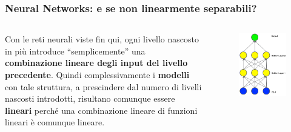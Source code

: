 \begin{frame}

	\frametitle{Neural Networks: e se non linearmente separabili?}

	\begin{columns}
		Con le reti neurali viste fin qui, ogni livello nascosto in più introduce ``semplicemente'' una \textbf{combinazione lineare degli input del livello precedente}.
		\newlinedouble
		Quindi complessivamente i \textbf{modelli} con tale struttura, a prescindere dal numero di livelli nascosti introdotti, risultano comunque essere \textbf{lineari} perché una combinazione lineare di funzioni lineari è comunque lineare.

		\begin{figure}[!htbp]
			\centering
			\includegraphics[width=1.0\linewidth]{images/supervised/z_algorithms_neural_networks/2hidden.png}
		\end{figure}
	\end{columns}


\end{frame}


